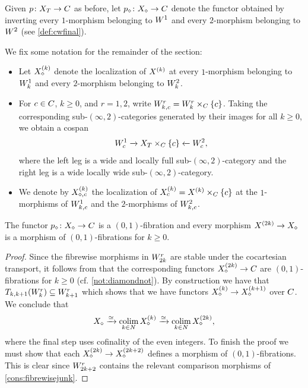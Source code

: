 \documentclass[a4paper,reqno,twoside]{amsart}
\begin{document}
\begin{definition}\label{def:diamond}
	Given $p\colon \relax{X}_T \to \relax{C}$ as before, let $p_{\diamond} \colon \relax{X}_{\diamond} \to \relax{C}$ denote the functor obtained by inverting every $1$-morphism belonging to $\relax{W}^1$ and every $2$-morphism belonging to $\relax{W}^{2}$ (see \cref{def:cwfinal}). 
\end{definition}

\begin{notation}\label{not:diamondnot}
	We fix some notation for the remainder of the section:
	\begin{itemize}
		\item Let $\relax{X}^{(k)}_{\diamond}$ denote the localization of $\relax{X}^{(k)}$ at every $1$-morphism belonging to $\relax{W}_{k}^{1}$ and every $2$-morphism belonging to $\relax{W}_{k}^{2}$.
		\item For $c\in\relax{C}$, $k\geq0$, and $r=1,2$, write $\relax{W}_{k,c}^{r}=\relax{W}_k^r\times_{\relax{C}}\{c\}$. Taking the corresponding sub-$(\infty,2)$-categories generated by their images for all $k\geq0$, we obtain a cospan
	\[
		\relax{W}_c^1 \xrightarrow{} \relax{X}_T\times_{\relax{C}}\{c\} \xleftarrow{} \relax{W}_c^2,
	\]
	   where the left leg is a wide and locally full sub-$(\infty,2)$-category and the right leg is a wide locally wide sub-$(\infty,2)$-category.
		\item We denote by $\relax{X}^{(k)}_{\diamond,c}$ the localization of $\relax{X}^{(k)}_c=\relax{X}^{(k)}\times_{\relax{C}}\{c\}$ at the $1$-morphisms of $\relax{W}_{k,c}^{1}$ and the $2$-morphisms of $\relax{W}_{k,c}^{2}$.
	\end{itemize}
	
\end{notation}

\begin{proposition}\label{prop:new01}
	The functor $p_{\diamond} \colon \relax{X}_{\diamond} \to \relax{C}$ is a $(0,1)$-fibration and every morphism $\relax{X}^{(2k)} \to \relax{X}_{\diamond}$ is a morphism of $(0,1)$-fibrations for $k\geq 0$.
\end{proposition}
\begin{proof}
	 Since the fibrewise morphisms in $\relax{W}_{2k}^{r}$ are stable under the cocartesian transport, it follows from \cite[Theorem 4.7.1]{AHM26} that the corresponding functors $\relax{X}^{(2k)}_\diamond \to \relax{C}$ are $(0,1)$-fibrations for $k\geq 0$ (cf. \cref{not:diamondnot}). By construction we have that $T_{k,k+1}(\relax{W}_{k}^{r})\subseteq \relax{W}_{k+1}^{r}$ which shows that we have functors $\relax{X}_{\diamond}^{(k)} \to \relax{X}_{\diamond}^{(k+1)}$ over $\relax{C}$. We conclude that 
	\[
		\relax{X}_{\diamond}\xrightarrow{\simeq}\operatorname*{colim}_{k \in \relax{N}}\relax{X}_{\diamond}^{(k)} \xrightarrow{\simeq}\operatorname*{colim}_{k \in \relax{N}}\relax{X}_{\diamond}^{(2k)},
	\]
	where the final step uses cofinality of the even integers.
	To finish the proof we must show that each $\relax{X}_{\diamond}^{(2k)} \to \relax{X}_{\diamond}^{(2k+2)}$ defines a morphism of $(0,1)$-fibrations. This is clear since $\relax{W}^{r}_{2k+2}$ contains the relevant comparison morphisms of \cref{cons:fibrewisejunk}.
\end{proof}
\end{document}
